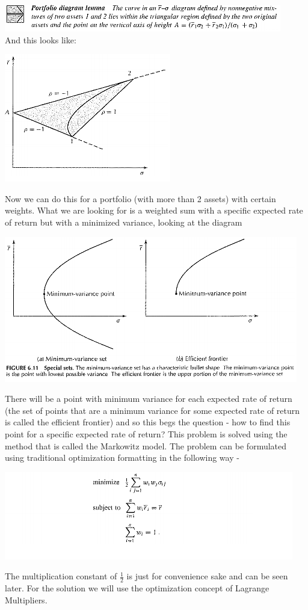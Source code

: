 \documentclass{article}
\begin{document}
\includegraphics{images/Second_Optimization_Photo.png} \\
And this looks like: 
\begin{center}
    \includegraphics{images/Third_Optimization_Photo.png}    
\end{center}
Now we can do this for a portfolio (with more than 2 assets) with certain weights. What we are looking for is a weighted sum with a specific expected rate of return but with a minimized variance, looking at the diagram 
\begin{center}
    \includegraphics[scale=0.85]{images/Fourth_Optimization_Photo.png}
\end{center}
There will be a point with minimum variance for each expected rate of return (the set of points that are a minimum variance for some expected rate of return is called the efficient frontier) and so this begs the question - how to find this point for a specific expected rate of return? This problem is solved using the method that is called the Markowitz model.
The problem can be formulated using traditional optimization formatting in the following way - 
\begin{center}
    \includegraphics{images/Fifth_Optimization_Photo.png}    
\end{center}
The multiplication constant of $\frac{1}{2}$ is just for convenience sake and can be seen later. For the solution we will use the optimization concept of Lagrange Multipliers.\\\\
\end{document}
